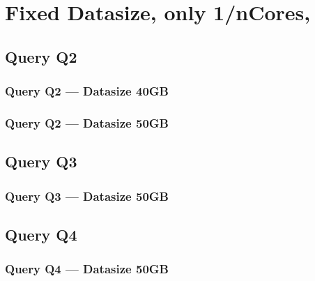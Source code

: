 
\newpage
\section{Fixed Datasize, only 1/nCores,}
\subsection{Query Q2}
\subsubsection{Query Q2 --- Datasize 40GB}



\newpage
\subsubsection{Query Q2 --- Datasize 50GB}



\newpage

\subsection{Query Q3}
\subsubsection{Query Q3 --- Datasize 50GB}



\newpage

\subsection{Query Q4}
\subsubsection{Query Q4 --- Datasize 50GB}



\newpage
